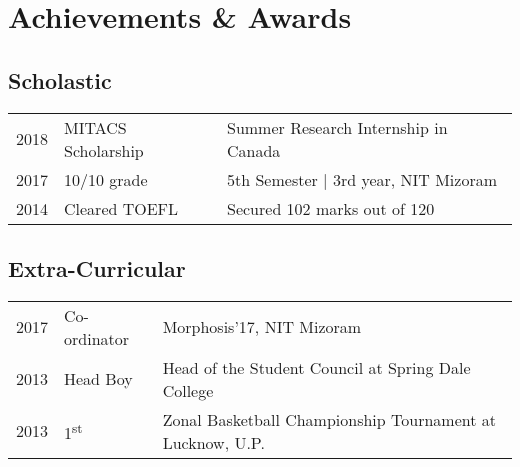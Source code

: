 
\section{Achievements \& Awards} 
\subsection{Scholastic}
\begin{tabular}{rll}
2018         & MITACS Scholarship & Summer Research Internship in Canada\\
2017	     & 10/10 grade  & 5th Semester | 3rd year, NIT Mizoram\\
2014         & Cleared TOEFL  & Secured 102 marks out of 120 \\
\end{tabular}
\sectionsep

\subsection{Extra-Curricular}
\begin{tabular}{rll}
2017         & Co-ordinator  & Morphosis'17, NIT Mizoram \\
2013         & Head Boy  & Head of the Student Council at Spring Dale College \\
2013         & 1\textsuperscript{st}  & Zonal Basketball Championship Tournament at Lucknow, U.P. \\
\end{tabular}
\sectionsep